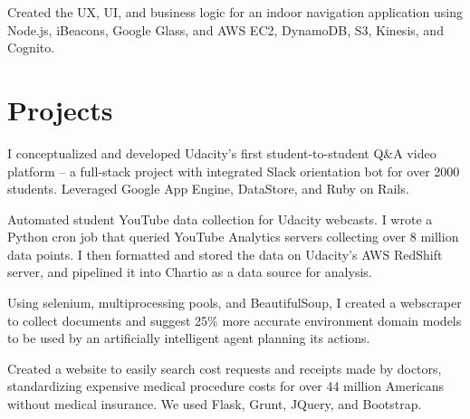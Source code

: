 \documentclass[]{deedy-resume-openfont}
\begin{document}
\begin{minipage}[t]{0.66\textwidth}
\begin{tightemize}
\item Created the UX, UI, and business logic for an indoor navigation application using Node.js, iBeacons, Google Glass, and AWS EC2, DynamoDB, S3, Kinesis, and Cognito.
\end{tightemize}


\section{Projects}

\begin{tightemize}
\item I conceptualized and developed Udacity's first student-to-student Q\&A video platform -- a full-stack project with integrated Slack orientation bot for over 2000 students. Leveraged Google App Engine, DataStore, and Ruby on Rails.
\end{tightemize}
\sectionsep

\begin{tightemize}
\item Automated student YouTube data collection for Udacity webcasts. I wrote a Python cron job that queried YouTube Analytics servers collecting over 8 million data points. I then formatted and stored the data on Udacity's AWS RedShift server, and pipelined it into Chartio as a data source for analysis.
\end{tightemize}
\sectionsep

\begin{tightemize}
\item Using selenium, multiprocessing pools, and BeautifulSoup, I created a webscraper to collect documents and suggest 25\% more accurate environment domain models to be used by an artificially intelligent agent planning its actions. 
\end{tightemize}
\sectionsep

\begin{tightemize}
\item Created a website to easily search cost requests and receipts made by doctors, standardizing expensive medical procedure costs for over 44 million Americans without medical insurance. We used Flask, Grunt, JQuery, and Bootstrap.
\end{tightemize}
\sectionsep


\end{minipage}
\end{document}
